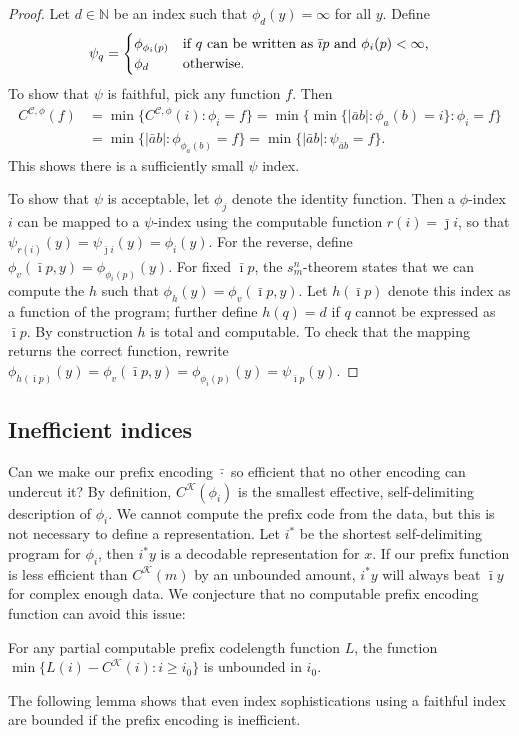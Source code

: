 \documentclass{style/llncs}
\newcommand{\C}{\mathscr C}
\newcommand{\K}{\mathscr K}
\newcommand{\N}{\mathbb N}
\newcommand{\tn}[1]{\textnormal{#1}}
\begin{document}
\begin{proof}
Let $d \in \N$ be an index such that $\phi_d(y)=\infty$ for all $y$. Define
  \[\psi_q=\begin{cases}
    \phi_{\phi_i(p)}&\tn{if $q$ can be written as $\bar\imath p$ and $\phi_i(p)<\infty$,}\\
    \phi_d&\tn{otherwise.}\end{cases}
  \]
  To show that $\psi$ is faithful, pick any function $f$. Then
\[\begin{split}
C^{\C, \phi}(f)&=\min\{C^{\C, \phi}(i):\phi_i=f\} =\min\{\min\{|\bar a b|:\phi_a(b)=i\}:\phi_i=f\} \\
& =\min\{|\bar a b|:\phi_{\phi_a(b)}=f\}
 =\min\{|\bar a b|:\psi_{\bar a b}=f\}.
\end{split}\]
This shows there is a sufficiently small $\psi$ index.

To show that $\psi$ is acceptable, let $\phi_j$ denote the identity
function. Then a $\phi$-index $i$ can be mapped to a $\psi$-index
using the computable function $r(i)=\bar\jmath i$, so that
$\psi_{r(i)}(y)=\psi_{\bar\jmath i}(y)=\phi_i(y)$. For the reverse,
define $\phi_v(\bar\imath p, y)=\phi_{\phi_i(p)}(y)$. For fixed
$\bar\imath p$, the 
$s^n_m$-theorem \cite{kleene193notation} states that we can compute the $h$
such that $\phi_h(y)=\phi_v(\bar\imath p,y)$. Let $h(\bar\imath p)$
denote this index as a function of the program; further define
$h(q)=d$ if $q$ cannot be expressed as $\bar\imath p$. By
construction $h$ is total and computable. To check that the mapping
returns the correct function, rewrite $\phi_{h(\bar\imath
  p)}(y)=\phi_v(\bar\imath p,y)=\phi_{\phi_i(p)}(y)=\psi_{\bar\imath p}(y)$.
\end{proof}

\subsection{Inefficient indices}
\label{section:appendix-inefficient-indices}

Can we make our prefix encoding $\bar\cdot$ so efficient that no other encoding can undercut it? By definition, $C^{\K}(\phi_i)$ is the smallest effective, self-delimiting description of $\phi_i$. We cannot compute the prefix code from the data, but this is not necessary to define a representation. Let $i^*$ be the shortest self-delimiting program for $\phi_i$, then $i^*y$ is a decodable representation for $x$. If our prefix function is less efficient than $C^\K(m)$ by an unbounded amount, $i^*y$ will always beat $\bar\imath y$ for complex enough data. We conjecture that no computable prefix encoding function can avoid this issue:
\begin{conjecture}
For any partial computable prefix codelength function $L$, the function $\min\{L(i)-C^\K(i):i\ge i_0\}$
is unbounded in $i_0$.
\end{conjecture}
The following lemma shows that even index sophistications using a faithful index are bounded if the prefix encoding is inefficient.
\end{document}
